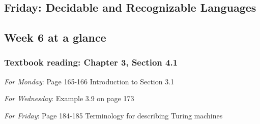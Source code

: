 


\newpage
\subsection*{Friday: Decidable and Recognizable Languages}



\newpage

\subsection*{Week 6 at a glance}

\subsubsection*{Textbook reading: Chapter 3, Section 4.1}

{\it For Monday}: Page 165-166 Introduction to Section 3.1

{\it For Wednesday}: Example 3.9 on page 173

{\it For Friday}:  Page 184-185 Terminology for describing Turing machines



